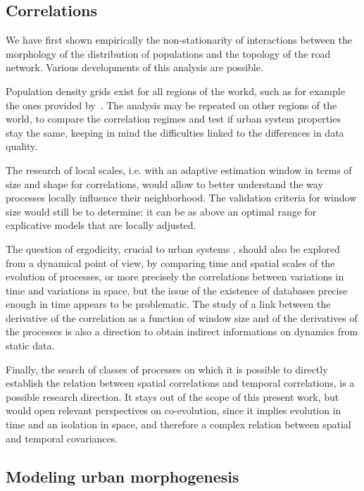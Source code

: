 \subsection{Correlations}

We have first shown empirically the non-stationarity of interactions between the morphology of the distribution of populations and the topology of the road network. Various developments of this analysis are possible.

Population density grids exist for all regions of the workd, such as for example the ones provided by~\cite{10.1371/journal.pone.0107042}.%
The analysis may be repeated on other regions of the world, to compare the correlation regimes and test if urban system properties stay the same, keeping in mind the difficulties linked to the differences in data quality.

The research of local scales, i.e. with an adaptive estimation window in terms of size and shape for correlations, would allow to better understand the way processes locally influence their neighborhood. The validation criteria for window size would still be to determine: it can be as above an optimal range for explicative models that are locally adjusted.

The question of ergodicity, crucial to urban systems \citep{pumain2012urban}, should also be explored from a dynamical point of view, by comparing time and spatial scales of the evolution of processes, or more precisely the correlations between variations in time and variations in space, but the issue of the existence of databases precise enough in time appears to be problematic. The study of a link between the derivative of the correlation as a function of window size and of the derivatives of the processes is also a direction to obtain indirect informations on dynamics from static data.


Finally, the search of classes of processes on which it is possible to directly establish the relation between spatial correlations and temporal correlations, is a possible research direction. It stays out of the scope of this present work, but would open relevant perspectives on co-evolution, since it implies evolution in time and an isolation in space, and therefore a complex relation between spatial and temporal covariances.

\subsection{Modeling urban morphogenesis}

